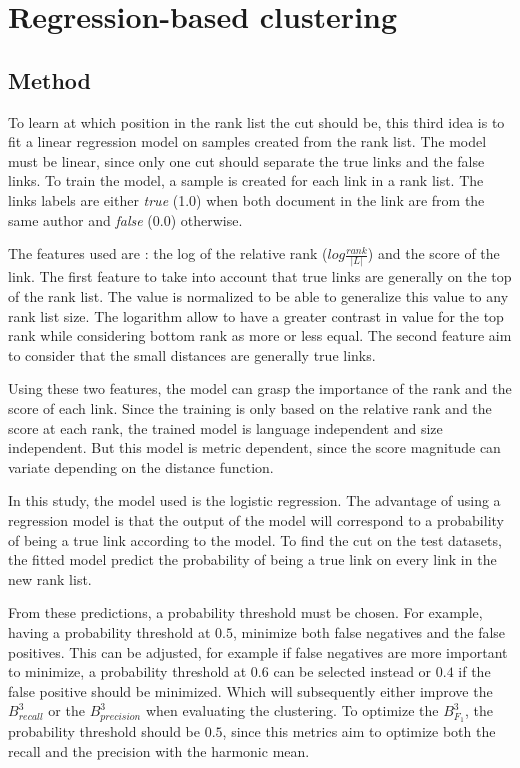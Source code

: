 \section{Regression-based clustering \label{sec:regression-based_clustering}}

\subsection{Method}

To learn at which position in the rank list the cut should be, this third idea is to fit a linear regression model on samples created from the rank list.
The model must be linear, since only one cut should separate the true links and the false links.
To train the model, a sample is created for each link in a rank list.
The links labels are either \textit{true} (1.0) when both document in the link are from the same author and \textit{false} (0.0) otherwise.

The features used are : the log of the relative rank ($log \frac{rank}{|L|}$) and the score of the link.
The first feature to take into account that true links are generally on the top of the rank list.
The value is normalized to be able to generalize this value to any rank list size.
The logarithm allow to have a greater contrast in value for the top rank while considering bottom rank as more or less equal.
The second feature aim to consider that the small distances are generally true links.

Using these two features, the model can grasp the importance of the rank and the score of each link.
Since the training is only based on the relative rank and the score at each rank, the trained model is language independent and size independent.
But this model is metric dependent, since the score magnitude can variate depending on the distance function.

In this study, the model used is the logistic regression.
The advantage of using a regression model is that the output of the model will correspond to a probability of being a true link according to the model.
To find the cut on the test datasets, the fitted model predict the probability of being a true link on every link in the new rank list.

From these predictions, a probability threshold must be chosen.
For example, having a probability threshold at $0.5$, minimize both false negatives and the false positives.
This can be adjusted, for example if false negatives are more important to minimize, a probability threshold at $0.6$ can be selected instead or $0.4$ if the false positive should be minimized.
Which will subsequently either improve the $B^3_{recall}$ or the $B^3_{precision}$ when evaluating the clustering.
To optimize the $B^3_{F_1}$, the probability threshold should be $0.5$, since this metrics aim to optimize both the recall and the precision with the harmonic mean.

